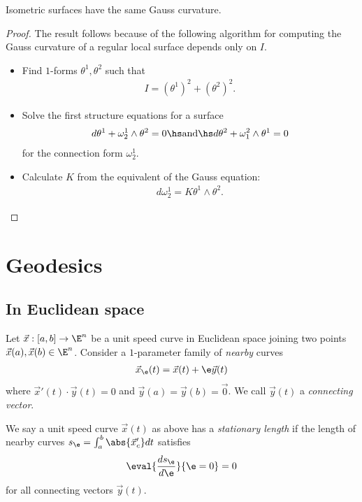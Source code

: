 \documentclass{article}
\begin{document}
\begin{theorem}
	Isometric surfaces have the same Gauss curvature.
\end{theorem}
\begin{proof}
	The result follows because of the following algorithm for computing the Gauss curvature
	of a regular local surface depends only on $I$.
	\begin{itemize}
		\item Find $1$-forms $\theta^1,\theta^2$ such that \begin{align*}
			      I = (\theta^1)^2 + (\theta^2)^2.
		      \end{align*}
		\item Solve the first structure equations for a surface \begin{align*}
			      d\theta^1 + \omega_2^1 \wedge \theta^2 = 0\hs\text{and}\hs
			      d\theta^2 + \omega_1^2 \wedge \theta^1 = 0
		      \end{align*}
		      for the connection form $\omega_2^1$.
		\item Calculate $K$ from the equivalent of the Gauss equation: \begin{align*}
			      d\omega_2^1 = K\theta^1\wedge\theta^2.
		      \end{align*}
	\end{itemize}
\end{proof}

\section{Geodesics}

\subsection{In Euclidean space}

\begin{definition}
	Let $\vec x:[a,b]\to\E^n$ be a unit speed curve in Euclidean space joining two points
	$\vec x(a),\vec x(b)\in\E^n$. Consider a $1$-parameter family of \emph{nearby} curves
	\begin{align*}
		\vec x_\e (t) = \vec x(t) + \e\vec y(t)
	\end{align*}
	where $\vec x'(t) \cdot \vec y(t)  = 0$ and $\vec y(a)=\vec y(b)=\vec 0$.
	We call $\vec y(t)$ a \emph{connecting vector}.
\end{definition}

\begin{definition}
	We say a unit speed curve $\vec x(t)$ as above has a \emph{stationary length} if
	the length of nearby curves $s_\e = \int_a^b \abs{\vec x'_c} dt$ satisfies
	\begin{align*}
		\eval{\frac{ds_\e}{d\e }}{\e=0}=0
	\end{align*}
	for all connecting vectors $\vec y(t)$.
\end{definition}
\end{document}
